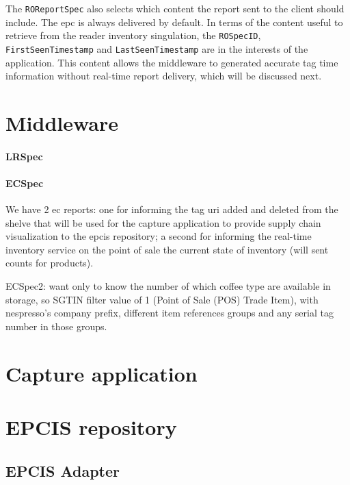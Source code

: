 The \texttt{ROReportSpec} also selects which content the report sent to the client should include.
The \ac{epc} is always delivered by default.
In terms of the content useful to retrieve from the reader inventory singulation, the \texttt{ROSpecID}, \texttt{FirstSeenTimestamp} and \texttt{LastSeenTimestamp} are in the interests of the application. 
This content allows the middleware to generated accurate tag time information without real-time report delivery, which will be discussed next.

\section{Middleware}



\paragraph{LRSpec}

\paragraph{ECSpec}

We have 2 ec reports: one for informing the tag uri added and deleted from the shelve that will be used for the capture application to provide supply chain visualization to the epcis repository; a second for informing the real-time inventory service on the point of sale the current state of inventory (will sent counts for products).

ECSpec2: want only to know the number of which coffee type are available in storage, so SGTIN filter value of 1 (Point of Sale (POS) Trade Item), with nespresso's company prefix, different item references groups and any serial tag number in those groups.


\section{Capture application}

\section{EPCIS repository}

\subsection{EPCIS Adapter}

